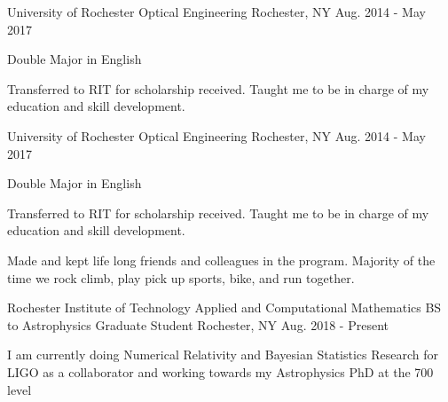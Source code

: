 \begin{cventries}
 \cventry
    {University of Rochester}
    {Optical Engineering}
    {Rochester, NY}
    {Aug. 2014 - May 2017}
    {
      \begin{cvitems}
        \item {Double Major in English}
        \item {Transferred to RIT for scholarship received. Taught me to be in charge of my education and skill development.}
      \end{cvitems}
      
   }
   
\cventry
    {University of Rochester}
    {Optical Engineering}
    {Rochester, NY}
    {Aug. 2014 - May 2017}
    {
      \begin{cvitems}
       \item{Double Major in English}
       \item{Transferred to RIT for scholarship received.  Taught me to be in charge of my education and skill development.}
       \item{Made and kept life long friends and colleagues in the program. Majority of the time we rock climb, play pick up sports, bike, and run together.}
      \end{cvitems}
   }

   
 \cventry
    {Rochester Institute of Technology}
    {Applied and Computational Mathematics BS to Astrophysics Graduate Student}
    {Rochester, NY}
    {Aug. 2018 - Present}
    {
      \begin{cvitems}
       \item{I am currently doing Numerical Relativity and Bayesian Statistics Research for LIGO as a collaborator and working towards my Astrophysics PhD at the 700 level}
      \end{cvitems}
   }



\end{cventries}
